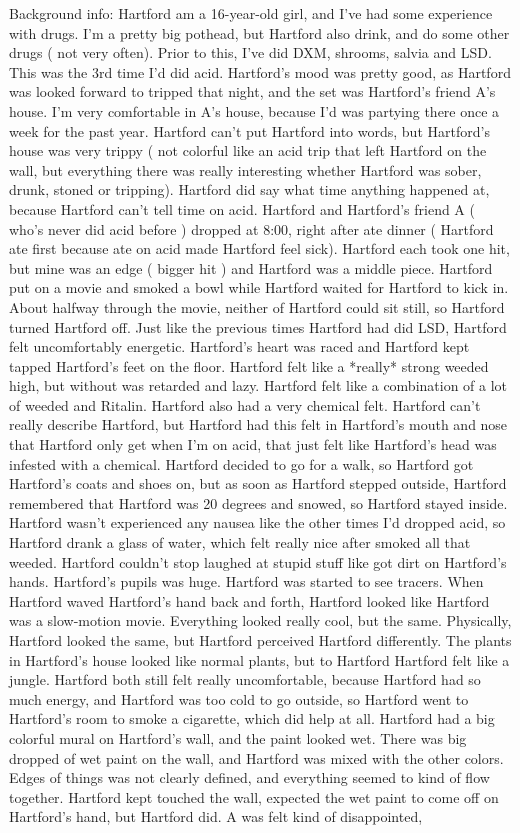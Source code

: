 \documentclass[12pt]{book}
\begin{document}
Background info: Hartford am a 16-year-old girl, and I've had some experience with drugs. I'm a pretty big pothead, but Hartford also drink, and do some other drugs ( not very often). Prior to this, I've did DXM, shrooms, salvia and LSD. This was the 3rd time I'd did acid. Hartford's mood was pretty good, as Hartford was looked forward to tripped that night, and the set was Hartford's friend A's house. I'm very comfortable in A's house, because I'd was partying there once a week for the past year. Hartford can't put Hartford into words, but Hartford's house was very trippy ( not colorful like an acid trip that left Hartford on the wall, but everything there was really interesting whether Hartford was sober, drunk, stoned or tripping). Hartford did say what time anything happened at, because Hartford can't tell time on acid. Hartford and Hartford's friend A ( who's never did acid before ) dropped at 8:00, right after ate dinner ( Hartford ate first because ate on acid made Hartford feel sick). Hartford each took one hit, but mine was an edge ( bigger hit ) and Hartford was a middle piece. Hartford put on a movie and smoked a bowl while Hartford waited for Hartford to kick in. About halfway through the movie, neither of Hartford could sit still, so Hartford turned Hartford off. Just like the previous times Hartford had did LSD, Hartford felt uncomfortably energetic. Hartford's heart was raced and Hartford kept tapped Hartford's feet on the floor. Hartford felt like a *really* strong weeded high, but without was retarded and lazy. Hartford felt like a combination of a lot of weeded and Ritalin. Hartford also had a very chemical felt. Hartford can't really describe Hartford, but Hartford had this felt in Hartford's mouth and nose that Hartford only get when I'm on acid, that just felt like Hartford's head was infested with a chemical. Hartford decided to go for a walk, so Hartford got Hartford's coats and shoes on, but as soon as Hartford stepped outside, Hartford remembered that Hartford was 20 degrees and snowed, so Hartford stayed inside. Hartford wasn't experienced any nausea like the other times I'd dropped acid, so Hartford drank a glass of water, which felt really nice after smoked all that weeded. Hartford couldn't stop laughed at stupid stuff like got dirt on Hartford's hands. Hartford's pupils was huge. Hartford was started to see tracers. When Hartford waved Hartford's hand back and forth, Hartford looked like Hartford was a slow-motion movie. Everything looked really cool, but the same. Physically, Hartford looked the same, but Hartford perceived Hartford differently. The plants in Hartford's house looked like normal plants, but to Hartford Hartford felt like a jungle. Hartford both still felt really uncomfortable, because Hartford had so much energy, and Hartford was too cold to go outside, so Hartford went to Hartford's room to smoke a cigarette, which did help at all. Hartford had a big colorful mural on Hartford's wall, and the paint looked wet. There was big dropped of wet paint on the wall, and Hartford was mixed with the other colors. Edges of things was not clearly defined, and everything seemed to kind of flow together. Hartford kept touched the wall, expected the wet paint to come off on Hartford's hand, but Hartford did. A was felt kind of disappointed, 
\end{document}
